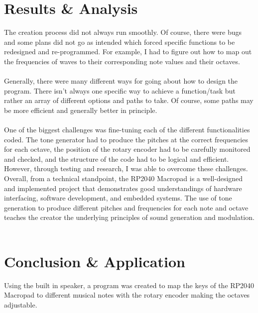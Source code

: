 \documentclass{article}
\begin{document}
\section{Results \& Analysis}

\hspace{1cm} The creation process did not always run smoothly. Of course, there were bugs and some plans did not go as intended which forced specific functions to be redesigned and re-programmed. For example, I had to figure out how to map out the frequencies of waves to their corresponding note values and their octaves.\\\\

Generally, there were many different ways for going about how to design the program. There isn't always one specific way to achieve a function/task but rather an array of different options and paths to take. Of course, some paths may be more efficient and generally better in principle. \\\\

One of the biggest challenges was  fine-tuning each of the different functionalities coded. The tone generator had to produce the pitches at the correct frequencies for each octave, the position of the rotary encoder had to be carefully monitored and checked, and the structure of the code had to be logical and efficient. However, through testing and research, I was able to overcome these challenges. Overall, from a technical standpoint, the RP2040 Macropad is a well-designed and implemented project that demonstrates good understandings of hardware interfacing, software development, and embedded systems. The use of tone generation to produce different pitches and frequencies for each note and octave teaches the creator the underlying principles of sound generation and modulation.\\\\

\section{Conclusion \& Application}

\hspace{1cm} Using the built in speaker, a program was created to map the keys of the RP2040 Macropad to different musical notes with the rotary encoder making the octaves adjustable.\\\\
\end{document}
